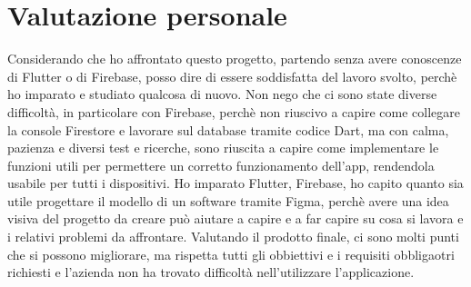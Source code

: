 \section{Valutazione personale}
Considerando che ho affrontato questo progetto, partendo senza avere conoscenze di Flutter o di Firebase, posso dire di essere soddisfatta del lavoro svolto, perchè ho imparato e studiato qualcosa di nuovo.\newline
Non nego che ci sono state diverse difficoltà, in particolare con Firebase, perchè non riuscivo a capire come collegare la console Firestore e lavorare sul database tramite codice Dart, ma con calma, pazienza e diversi test e ricerche, sono riuscita a capire come implementare le funzioni utili per permettere un corretto funzionamento dell'app, rendendola usabile per tutti i dispositivi.\newline
\newline
Ho imparato Flutter, Firebase, ho capito quanto sia utile progettare il modello di un software tramite Figma, perchè avere una idea visiva del progetto da creare può aiutare a capire e a far capire su cosa si lavora e i relativi problemi da affrontare.\newline
Valutando il prodotto finale, ci sono molti punti che si possono migliorare, ma rispetta tutti gli obbiettivi e i requisiti obbligaotri richiesti e l'azienda non ha trovato difficoltà nell'utilizzare l'applicazione.\newline
